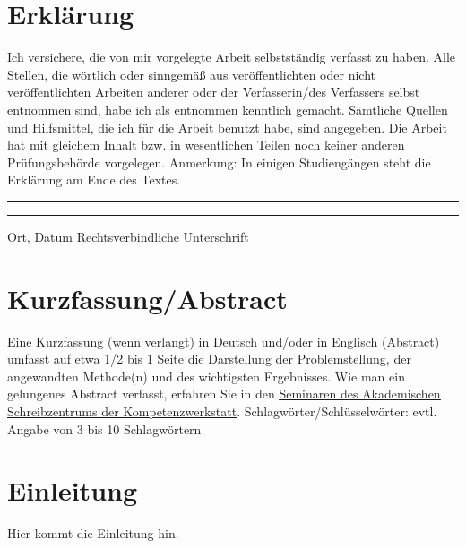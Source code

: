 \documentclass[a4paper,11pt]{article}%
\renewcommand{\\}{\vspace*{0.5\baselineskip} \newline}
\begin{document}
\section*{Erklärung}
Ich versichere, die von mir vorgelegte Arbeit selbstständig verfasst zu haben. Alle Stellen, die wörtlich oder sinngemäß aus veröffentlichten oder nicht veröffentlichten Arbeiten anderer oder der Verfasserin/des Verfassers selbst entnommen sind, habe ich als entnommen kenntlich gemacht. Sämtliche Quellen und Hilfsmittel, die ich für die Arbeit benutzt habe, sind angegeben. Die Arbeit hat mit gleichem Inhalt bzw. in wesentlichen Teilen noch keiner anderen Prüfungsbehörde vorgelegen.\\
Anmerkung: In einigen Studiengängen steht die Erklärung am Ende des Textes.\\
~\\
~\\
\rule{0.35\textwidth}{0.4pt} \hspace*{3cm} \rule{0.45\textwidth}{0.4pt} \newline
Ort, Datum	\hspace*{6.3cm}	Rechtsverbindliche Unterschrift
\newpage
\section*{Kurzfassung/Abstract}
Eine Kurzfassung (wenn verlangt) in Deutsch und/oder in Englisch (Abstract) umfasst auf etwa 1/2 bis 1 Seite die Darstellung der Problemstellung, der angewandten Methode(n) und des wichtigsten Ergebnisses.\\
Wie man ein gelungenes Abstract verfasst, erfahren Sie in den \href{https://www.th-koeln.de/studium/schluesselkompetenzen_25490.php}{\underline{Seminaren des Akademischen} \underline{Schreibzentrums der Kompetenzwerkstatt}}.\\
Schlagwörter/Schlüsselwörter: evtl. Angabe von 3 bis 10 Schlagwörtern 
\newpage
\tableofcontents
\newpage
\listoftables{}
\newpage
\listoffigures{}
\newpage
{}
\section*{Einleitung}
Hier kommt die Einleitung hin.
\end{document}
